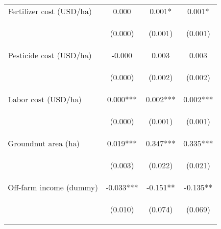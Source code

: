 \begin{center}
\begin{tabular}{lccc}
Fertilizer cost (USD/ha) & 0.000 & 0.001* & 0.001* \\
\vspace{4pt} & \begin{footnotesize}(0.000)\end{footnotesize} & \begin{footnotesize}(0.001)\end{footnotesize} & \begin{footnotesize}(0.001)\end{footnotesize} \\
Pesticide cost (USD/ha) & -0.000 & 0.003 & 0.003 \\
\vspace{4pt} & \begin{footnotesize}(0.000)\end{footnotesize} & \begin{footnotesize}(0.002)\end{footnotesize} & \begin{footnotesize}(0.002)\end{footnotesize} \\
Labor cost (USD/ha) & 0.000*** & 0.002*** & 0.002*** \\
\vspace{4pt} & \begin{footnotesize}(0.000)\end{footnotesize} & \begin{footnotesize}(0.001)\end{footnotesize} & \begin{footnotesize}(0.001)\end{footnotesize} \\
Groundnut area (ha) & 0.019*** & 0.347*** & 0.335*** \\
\vspace{4pt} & \begin{footnotesize}(0.003)\end{footnotesize} & \begin{footnotesize}(0.022)\end{footnotesize} & \begin{footnotesize}(0.021)\end{footnotesize} \\
Off-farm income (dummy) & -0.033*** & -0.151** & -0.135** \\
\vspace{4pt} & \begin{footnotesize}(0.010)\end{footnotesize} & \begin{footnotesize}(0.074)\end{footnotesize} & \begin{footnotesize}(0.069)\end{footnotesize} \\

\end{tabular}
\end{center}
